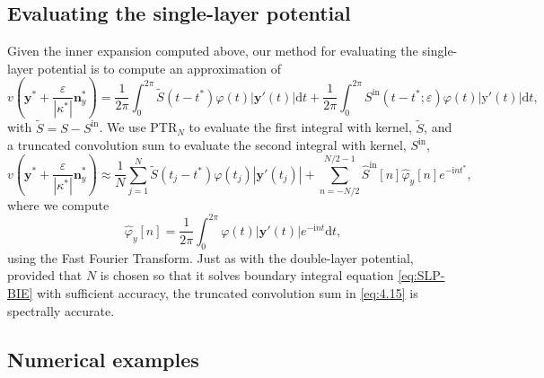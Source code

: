 \documentclass{article}[12pt]
\renewcommand{\epsilon}{\varepsilon}
\numberwithin{equation}{section}
\begin{document}
\subsection{Evaluating the single-layer potential}

Given the inner expansion computed above, our method for evaluating
the single-layer potential is to compute an approximation of
\begin{equation}
  v\left(\mathbf{y}^{\ast} + \frac{\epsilon}
{  |\kappa^{\ast}| }\mathbf{n}_{y}^{\ast} \right) = \frac{1}{2\pi}
  \int_{0}^{2\pi} \tilde{S}(t - t^{\ast}) \varphi(t) | \mathbf{y}'(t) |
  \mathrm{d}t + \frac{1}{2\pi} \int_{0}^{2\pi} S^{\text{in}}(t -
  t^{\ast};\epsilon) \varphi(t) | \mathrm{y}'(t) | \mathrm{d}t,
  \label{eq:4.9}
\end{equation}
with $\tilde{S} = S - S^{\text{in}}$. We use
PTR$_{N}$ to evaluate the first integral with kernel,
$\tilde{S}$, and a truncated convolution sum to evaluate the second
integral with kernel, $S^{\text{in}}$,
\begin{equation}
  v\left(\mathbf{y}^{\ast} + \frac{\epsilon}
    {  |\kappa^{\ast}| }\mathbf{n}_{y}^{\ast} \right)  \approx
  \frac{1}{N} \sum_{j = 1}^{N} \tilde{S}(t_{j} - t^{\ast})
  \varphi(t_{j}) | \mathbf{y}'(t_{j}) | + \sum_{n = -N/2}^{N/2-1}
  \hat{S}^{\text{in}}[n] \hat{\varphi}_{y}[n] e^{-\mathrm{i} n t^\ast},
  \label{eq:4.15}
\end{equation}
where we compute
\begin{equation}
  \hat{\varphi}_{y}[n] = \frac{1}{2\pi} \int_{0}^{2\pi} \varphi(t) |
  \mathbf{y}'(t) | e^{-\mathrm{i} n t} \mathrm{d}t,
  \label{eq:4.16}
\end{equation}
using the Fast Fourier Transform.  Just as with the double-layer
potential, provided that $N$ is chosen so that it solves boundary
integral equation \eqref{eq:SLP-BIE} with sufficient accuracy, the
truncated convolution sum in \eqref{eq:4.15} is spectrally accurate.

\subsection{Numerical examples}\label{ssec:SLPresults}
\end{document}
